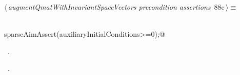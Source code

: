 \documentclass{article}
\begin{document}
\begin{flushleft} \small
\begin{minipage}{\linewidth}\label{scrap154}\raggedright\small
{} $\langle\,${\itshape augmentQmatWithInvariantSpaceVectors precondition assertions}\nobreak\ {\footnotesize {88c}}$\,\rangle\equiv$
\vspace{-1ex}
\begin{list}{}{} \item
\mbox{}\verb@@\\
\mbox{}\verb@      sparseAimAssert(auxiliaryInitialConditions>=0);@\\
\mbox{}\verb@@{\NWsep}
\end{list}
\vspace{-1.5ex}
\footnotesize
\begin{list}{}{\setlength{\itemsep}{-\parsep}\setlength{\itemindent}{-\leftmargin}}
\item \NWtxtMacroDefBy\ .
\item \NWtxtMacroRefIn\ .

\item{}
\end{list}
\end{minipage}\vspace{4ex}
\end{flushleft}
\end{document}
